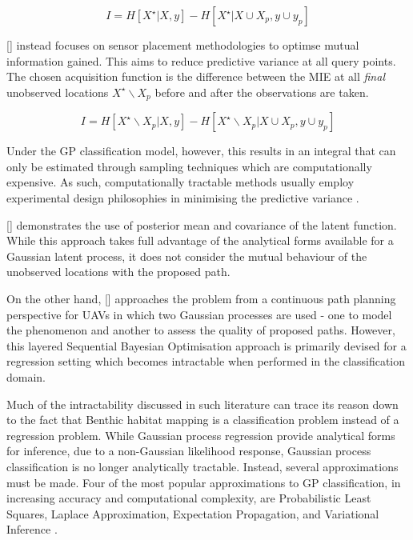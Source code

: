 \documentclass{article}
\newcommand{\incite}[1]{\citeauthor{#1} [\citeyear{#1}]}
\begin{document}
	\begin{equation}
		I = H[X^{\star} | X, y] - H[X^{\star} | X \cup X_{p}, y \cup y_{p}]
	\label{Equation:AsherBenderMutualInformationCriterion}
	\end{equation}
	
	\incite{Krause:2008:NSP:1390681.1390689} instead focuses on sensor placement methodologies to optimse mutual information gained. This aims to reduce predictive variance at all query points. The chosen acquisition function is the difference between the MIE at all \textit{final} unobserved locations $X^{\star} \backslash X_{p}$ before and after the observations are taken.
	
	\begin{equation}
		I = H[X^{\star} \backslash X_{p} | X, y] - H[X^{\star} \backslash X_{p} | X \cup X_{p}, y \cup y_{p}]
	\label{Equation:KrauseAcquisitionCriterion}
	\end{equation}
	
	Under the GP classification model, however, this results in an integral that can only be estimated through sampling techniques which are computationally expensive. As such, computationally tractable methods usually employ experimental design philosophies in minimising the predictive variance \cite{AsherBender}.
	
	\incite{Kapoor} demonstrates the use of posterior mean and covariance of the latent function. While this approach takes full advantage of the analytical forms available for a Gaussian latent process, it does not consider the mutual behaviour of the unobserved locations with the proposed path.
	
	On the other hand, \incite{Roman:SequentialBayesianOptimisation} approaches the problem from a continuous path planning perspective for UAVs in which two Gaussian processes are used - one to model the phenomenon and another to assess the quality of proposed paths. However, this layered Sequential Bayesian Optimisation approach is primarily devised for a regression setting which becomes intractable when performed in the classification domain.
	
	Much of the intractability discussed in such literature can trace its reason down to the fact that Benthic habitat mapping is a classification problem instead of a regression problem. While Gaussian process regression provide analytical forms for inference, due to a non-Gaussian likelihood response, Gaussian process classification is no longer analytically tractable. Instead, several approximations must be made. Four of the most popular approximations to GP classification, in increasing accuracy and computational complexity, are Probabilistic Least Squares, Laplace Approximation, Expectation Propagation, and Variational Inference \cite{GaussianProcessForMachineLearning}.
	
\end{document}
